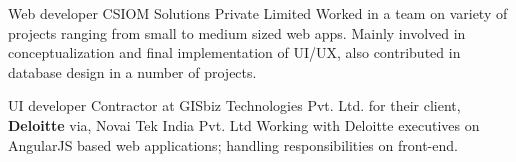     {Web developer}
    {}
    {CSIOM Solutions Private Limited}
    {}
    {Worked in a team on variety of projects ranging from small to medium sized web apps. Mainly involved in conceptualization and final implementation of UI/UX, also contributed in database design in a number of projects.
    }
    \vspace*{0.2\baselineskip}

    {UI developer}
    {Contractor}
    {at GISbiz Technologies Pvt. Ltd. for their client, \textbf{Deloitte}}
    {via, Novai Tek India Pvt. Ltd}
    {Working with Deloitte executives on AngularJS based web applications; handling responsibilities on front-end. 
    }
    \vspace*{0.2\baselineskip}
